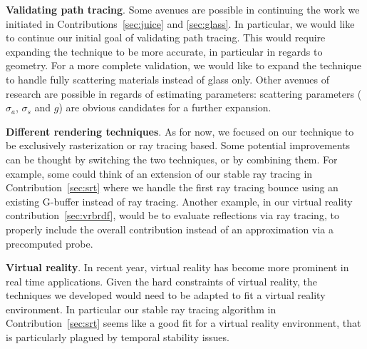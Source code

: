 \textbf{Validating path tracing}. Some avenues are possible in continuing the work we initiated in Contributions~\ref{sec:juice} and \ref{sec:glass}. In particular, we would like to continue our initial goal of validating path tracing. This would require expanding the technique to be more accurate, in particular in regards to geometry. For a more complete validation, we would like to expand the technique to handle fully scattering materials instead of glass only. Other avenues of research are possible in regards of estimating parameters: scattering parameters ($\sigma_a$, $\sigma_s$ and $g$) are obvious candidates for a further expansion.

\textbf{Different rendering techniques}. As for now, we focused on our technique to be exclusively rasterization or ray tracing based. Some potential improvements can be thought by switching the two techniques, or by combining them. For example, some could think of an extension of our stable ray tracing in Contribution~\ref{sec:srt} where we handle the first ray tracing bounce using an existing G-buffer instead of ray tracing. Another example, in our virtual reality contribution~\ref{sec:vrbrdf}, would be to evaluate reflections via ray tracing, to properly include the overall contribution instead of an approximation via a precomputed probe.

\textbf{Virtual reality}. In recent year, virtual reality has become more prominent in real time applications. Given the hard constraints of virtual reality, the techniques we developed would need to be adapted to fit a virtual reality environment. In particular our stable ray tracing algorithm in Contribution~\ref{sec:srt} seems like a good fit for a virtual reality environment, that is particularly plagued by temporal stability issues. 
